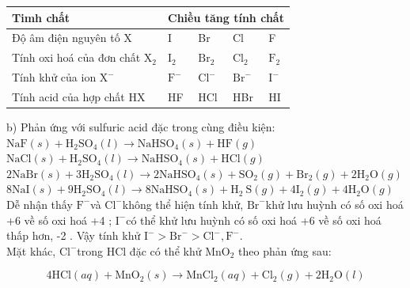 \documentclass[10pt]{article}
\begin{document}
\begin{center}
\begin{tabular}{|l|l|l|l|l|}
\hline
Timh chất & \multicolumn{4}{|c|}{Chiều tăng tính chất} \\
\hline
Độ âm điện nguyên tố X & I & Br & Cl & F \\
\hline
Tính oxi hoá của đơn chất $\mathrm{X}_{2}$ & $\mathrm{I}_{2}$ & $\mathrm{Br}_{2}$ & $\mathrm{Cl}_{2}$ & $\mathrm{F}_{2}$ \\
\hline
Tính khử của ion $\mathrm{X}^{-}$ & $\mathrm{F}^{-}$ & $\mathrm{Cl}^{-}$ & $\mathrm{Br}^{-}$ & $\mathrm{I}^{-}$ \\
\hline
Tính acid của hợp chất HX & HF & HCl & HBr & HI \\
\hline
\end{tabular}
\end{center}

b) Phản ứng với sulfuric acid đặc trong cùng điều kiện:\\
$\mathrm{NaF}(s)+\mathrm{H}_{2} \mathrm{SO}_{4}(l) \rightarrow \mathrm{NaHSO}_{4}(s)+\mathrm{HF}(g)$\\
$\mathrm{NaCl}(s)+\mathrm{H}_{2} \mathrm{SO}_{4}(l) \rightarrow \mathrm{NaHSO}_{4}(s)+\mathrm{HCl}(g)$\\
$2 \mathrm{NaBr}(s)+3 \mathrm{H}_{2} \mathrm{SO}_{4}(l) \rightarrow 2 \mathrm{NaHSO}_{4}(s)+\mathrm{SO}_{2}(g)+\mathrm{Br}_{2}(g)+2 \mathrm{H}_{2} \mathrm{O}(g)$\\
$8 \mathrm{NaI}(s)+9 \mathrm{H}_{2} \mathrm{SO}_{4}(l) \rightarrow 8 \mathrm{NaHSO}_{4}(s)+\mathrm{H}_{2} \mathrm{~S}(g)+4 \mathrm{I}_{2}(g)+4 \mathrm{H}_{2} \mathrm{O}(g)$\\
Dễ nhận thấy $\mathrm{F}^{-}$và $\mathrm{Cl}^{-}$không thể hiện tính khử, $\mathrm{Br}^{-}$khử lưu huỳnh có số oxi hoá +6 về số oxi hoá +4 ; $\mathrm{I}^{-}$có thể khử lưu huỳnh có số oxi hoá +6 về số oxi hoá thấp hơn, -2 . Vậy tính khử $\mathrm{I}^{-}>\mathrm{Br}^{-}>\mathrm{Cl}^{-}, \mathrm{F}^{-}$.\\
Mặt khác, $\mathrm{Cl}^{-}$trong HCl đặc có thể khử $\mathrm{MnO}_{2}$ theo phản ứng sau:

$$
4 \mathrm{HCl}(a q)+\mathrm{MnO}_{2}(s) \rightarrow \mathrm{MnCl}_{2}(a q)+\mathrm{Cl}_{2}(g)+2 \mathrm{H}_{2} \mathrm{O}(l)
$$
\end{document}
